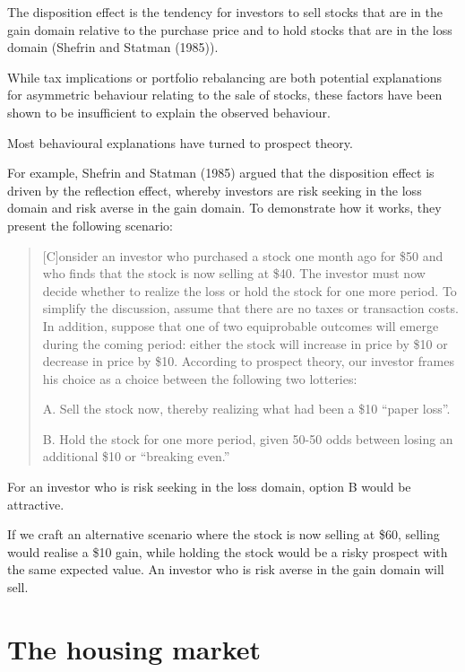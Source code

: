 \documentclass[
  letterpaper,
  DIV=11,
  numbers=noendperiod]{scrreprt}
\begin{document}
The disposition effect is the tendency for investors to sell stocks that
are in the gain domain relative to the purchase price and to hold stocks
that are in the loss domain (Shefrin and Statman (1985)).

While tax implications or portfolio rebalancing are both potential
explanations for asymmetric behaviour relating to the sale of stocks,
these factors have been shown to be insufficient to explain the observed
behaviour.

Most behavioural explanations have turned to prospect theory.

For example, Shefrin and Statman (1985) argued that the disposition
effect is driven by the reflection effect, whereby investors are risk
seeking in the loss domain and risk averse in the gain domain. To
demonstrate how it works, they present the following scenario:

\begin{quote}
{[}C{]}onsider an investor who purchased a stock one month ago for \$50
and who finds that the stock is now selling at \$40. The investor must
now decide whether to realize the loss or hold the stock for one more
period. To simplify the discussion, assume that there are no taxes or
transaction costs. In addition, suppose that one of two equiprobable
outcomes will emerge during the coming period: either the stock will
increase in price by \$10 or decrease in price by \$10. According to
prospect theory, our investor frames his choice as a choice between the
following two lotteries:

A. Sell the stock now, thereby realizing what had been a \$10 ``paper
loss''.

B. Hold the stock for one more period, given 50-50 odds between losing
an additional \$10 or ``breaking even.''
\end{quote}

For an investor who is risk seeking in the loss domain, option B would
be attractive.

If we craft an alternative scenario where the stock is now selling at
\$60, selling would realise a \$10 gain, while holding the stock would
be a risky prospect with the same expected value. An investor who is
risk averse in the gain domain will sell.

\hypertarget{the-housing-market}{%
\section{The housing market}\label{the-housing-market}}
\end{document}
